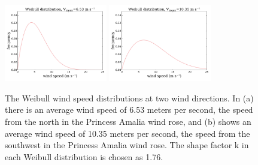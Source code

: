 \begin{figure}[htbp]
  \centering
  \includegraphics[width=0.4\textwidth]{Figures/weibull_6_53.pdf}\label{653}
  \includegraphics[width=0.4\textwidth]{Figures/weibull_10_35.pdf}\label{1035}
  \caption{\label{weibull} The Weibull wind speed distributions at two wind directions. In (a) there is an average wind speed of 6.53 meters per second, the speed from the north in the Princess Amalia wind rose, and (b) shows an average wind speed of 10.35 meters per second, the speed from the southwest in the Princess Amalia wind rose. The shape factor k in each Weibull distribution is chosen as 1.76.}
\end{figure}
